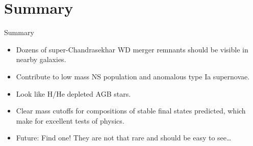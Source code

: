\documentclass{beamer}
\begin{document}
\section{Summary}

\begin{frame}{Summary}
\begin{itemize}
\item {Dozens of super-Chandrasekhar WD merger remnants should be visible in nearby galaxies.}
\item {Contribute to low mass NS population and anomalous type Ia supernovae.}
\item {Look like H/He depleted AGB stars.}
\item {Clear mass cutoffs for compositions of stable final states predicted, which make for excellent tests of physics.}
\item {Future: Find one! They are not that rare and should be easy to see\ldots}
\end{itemize}
\end{frame}
\end{document}
